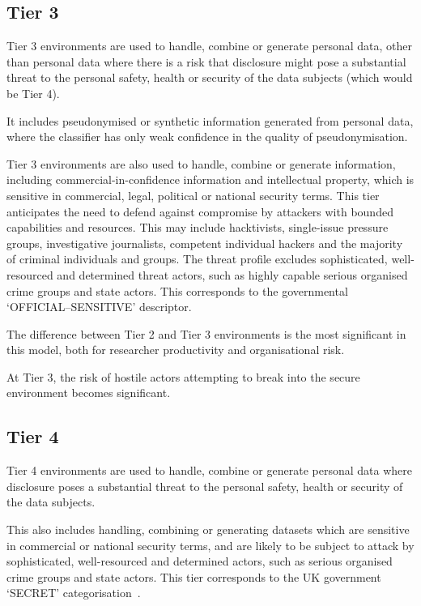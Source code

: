 \documentclass[10pt,a4paper,twocolumn]{article}
\begin{document}
\subsection{Tier 3}

Tier 3 environments are used to handle, combine or generate personal data, other than personal data where there is a risk that disclosure might pose a substantial threat to the personal safety, health or security of the data subjects (which would be Tier 4).

It includes pseudonymised or synthetic information generated from personal data, where the classifier has only weak
confidence in the quality of pseudonymisation.

Tier 3 environments are also used to handle, combine or generate information, including commercial-in-confidence information and intellectual property, which is sensitive in commercial, legal, political or national 
security terms. 
This tier anticipates the need to defend against compromise by attackers with bounded capabilities and resources.
This may include hacktivists, single-issue pressure groups, investigative journalists, competent individual hackers and the majority of criminal individuals and groups.
The threat profile excludes sophisticated, well-resourced and determined threat actors, such as highly capable serious organised crime groups and state actors.
This corresponds to the governmental ‘OFFICIAL–SENSITIVE’ descriptor. \cite{classifications}

The difference between Tier 2 and Tier 3 environments is the most significant in this model, both for researcher productivity and organisational risk. 

At Tier 3, the risk of hostile actors attempting to break into the secure environment becomes significant.

\subsection{Tier 4}

Tier 4 environments are used to handle, combine or generate personal data 
where disclosure poses a substantial threat to the personal safety, health or security of the data subjects.

This also includes handling, combining or generating datasets which are sensitive in commercial or national 
security terms, and are likely to be subject to attack by sophisticated, 
well-resourced and determined actors, such as serious organised crime groups and state actors. This
tier corresponds to the UK government `SECRET' categorisation~\cite{classifications}.
\end{document}
